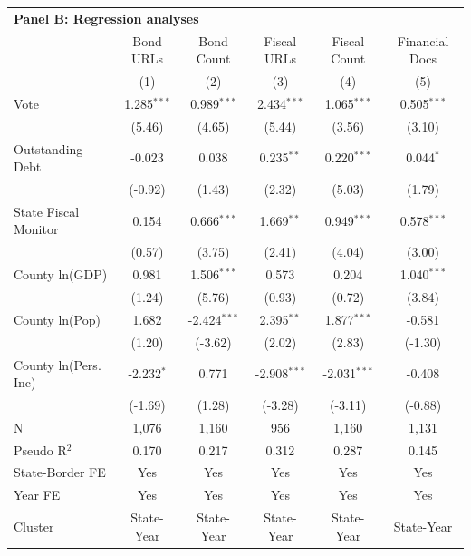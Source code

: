 \begingroup
\centering
\begin{tabular*}{\textwidth}{@{\extracolsep{\fill}}lccccc}
\multicolumn{5}{l}{\textbf{Panel B: Regression analyses}}\\

\addlinespace
   \toprule
                        & Bond URLs     & Bond Count     & Fiscal URLs    & Fiscal Count   & Financial Docs\\  
                        & (1)           & (2)            & (3)            & (4)            & (5)\\  
   \midrule 
   Vote                 & 1.285$^{***}$ & 0.989$^{***}$  & 2.434$^{***}$  & 1.065$^{***}$  & 0.505$^{***}$\\   
                        & (5.46)       & (4.65)        & (5.44)        & (3.56)        & (3.10)\\   
   Outstanding Debt     & -0.023        & 0.038          & 0.235$^{**}$   & 0.220$^{***}$  & 0.044$^{*}$\\   
                        & (-0.92)      & (1.43)        & (2.32)        & (5.03)        & (1.79)\\   
   State Fiscal Monitor & 0.154         & 0.666$^{***}$  & 1.669$^{**}$   & 0.949$^{***}$  & 0.578$^{***}$\\   
                        & (0.57)       & (3.75)        & (2.41)        & (4.04)        & (3.00)\\   
   County ln(GDP)       & 0.981         & 1.506$^{***}$  & 0.573          & 0.204          & 1.040$^{***}$\\   
                        & (1.24)       & (5.76)        & (0.93)        & (0.72)        & (3.84)\\   
   County ln(Pop)       & 1.682         & -2.424$^{***}$ & 2.395$^{**}$   & 1.877$^{***}$  & -0.581\\   
                        & (1.20)       & (-3.62)       & (2.02)        & (2.83)        & (-1.30)\\   
   County ln(Pers. Inc) & -2.232$^{*}$  & 0.771          & -2.908$^{***}$ & -2.031$^{***}$ & -0.408\\   
                        & (-1.69)      & (1.28)        & (-3.28)       & (-3.11)       & (-0.88)\\   
   \hline
   N         & 1,076         & 1,160          & 956            & 1,160          & 1,131\\  
   Pseudo R$^2$         & 0.170         & 0.217          & 0.312          & 0.287          & 0.145\\  
   State-Border FE      & Yes           & Yes            & Yes            & Yes            & Yes\\  
   Year FE              & Yes           & Yes            & Yes            & Yes            & Yes\\  
   Cluster              & State-Year & State-Year & State-Year & State-Year & State-Year\\  
   \bottomrule
\end{tabular*}
\par\endgroup
